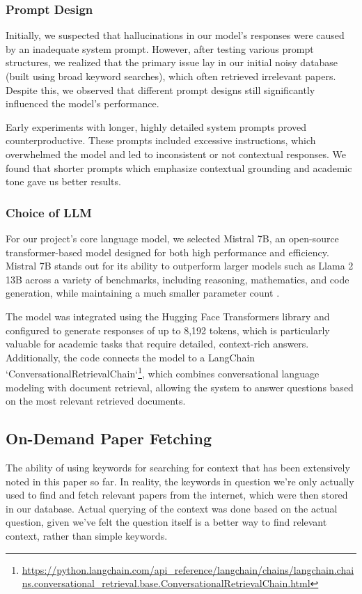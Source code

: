 \documentclass[fleqn,moreauthors,10pt]{ds_report}
\begin{document}
\subsubsection*{Prompt Design}

Initially, we suspected that hallucinations in our model’s responses were caused by an inadequate system prompt. However, after testing various prompt structures, we realized that the primary issue lay in our initial noisy database (built using broad keyword searches), which often retrieved irrelevant papers. Despite this, we observed that different prompt designs still significantly influenced the model’s performance.

Early experiments with longer, highly detailed system prompts proved counterproductive. These prompts included excessive instructions, which overwhelmed the model and led to inconsistent or not contextual responses. We found that shorter prompts which emphasize contextual grounding and academic tone gave us better results.

\subsubsection*{Choice of LLM}

For our project’s core language model, we selected Mistral 7B, an open-source transformer-based model designed for both high performance and efficiency. Mistral 7B stands out for its ability to outperform larger models such as Llama 2 13B across a variety of benchmarks, including reasoning, mathematics, and code generation, while maintaining a much smaller parameter count \cite{jiang2023mistral7b}.

The model was integrated using the Hugging Face Transformers library and configured to generate responses of up to 8,192 tokens, which is particularly valuable for academic tasks that require detailed, context-rich answers. Additionally, the code connects the model to a LangChain `ConversationalRetrievalChain`\footnote{\url{https://python.langchain.com/api_reference/langchain/chains/langchain.chains.conversational_retrieval.base.ConversationalRetrievalChain.html}}, which combines conversational language modeling with document retrieval, allowing the system to answer questions based on the most relevant retrieved documents.


\subsection*{On-Demand Paper Fetching}
The ability of using keywords for searching for context that has been extensively noted in this paper so far. In reality, the keywords in question we're only actually used to find and fetch relevant papers from the internet, which were then stored in our database. Actual querying of the context was done based on the actual question, given we've felt the question itself is a better way to find relevant context, rather than simple keywords.
\end{document}
